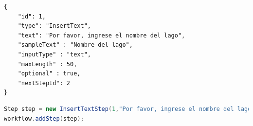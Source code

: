 \begin{lstlisting}[language=XML, frame=tlbr, caption=InsertTextStep usando el generador de clases.]	
{
	"id": 1,
	"type": "InsertText",
	"text": "Por favor, ingrese el nombre del lago",
	"sampleText" : "Nombre del lago",
	"inputType" : "text",
	"maxLength" : 50,
	"optional" : true,
	"nextStepId": 2
}
\end{lstlisting}

\begin{lstlisting}[language=Java, frame=tlbr, caption=InsertTextStep en Java.]	
Step step = new InsertTextStep(1,"Por favor, ingrese el nombre del lago","Nombre del lago",50, InsertTextStep.InputType.TYPE_TEXT, true,2);
workflow.addStep(step);
\end{lstlisting}



